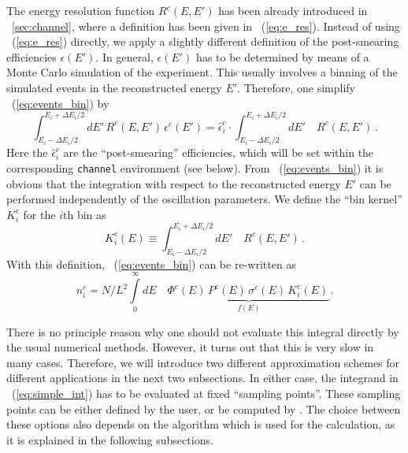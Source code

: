 The energy resolution function $R^c(E,E')$ has been already introduced in 
\Sec~\ref{sec:channel}, where a definition
has been given in \eq~(\ref{eq:e_res}). Instead of using
 \eq~(\ref{eq:e_res}) directly, we apply a slightly different
definition of the post-smearing efficiencies $\epsilon(E')$. 
In general, $\epsilon(E')$ has to be
determined by means of a Monte Carlo simulation of the experiment. 
This usually involves a binning of the simulated events in the 
reconstructed energy $E'$. Therefore, one simplify \eq~(\ref{eq:events_bin}) by
\begin{equation}
\label{eq:post_smearing}
\int_{E_i-\Delta E_i/2}^{E_i+\Delta E_i/2} dE' \, R^c(E,E') \, \epsilon^c(E') = \hat\epsilon_i^c \cdot \int_{E_i-\Delta E_i/2}^{E_i+\Delta E_i/2} dE' 
\quad R^c(E,E')\,.
\end{equation}
Here the  $\hat\epsilon_i^c$ are the 
``post-smearing'' efficiencies, which will be set within the corresponding {\tt channel} environment (see below).
From \eq~(\ref{eq:events_bin}) it is obvious that the integration with respect to the reconstructed energy $E'$ can be
performed independently of the oscillation parameters. We define
the ``bin kernel'' $K_i^c$ for the $i$th bin as
\begin{equation}
\label{eq:kernel}
K_i^c(E) \equiv \int_{E_i-\Delta E_i/2}^{E_i+\Delta E_i/2} dE' 
\quad R^c(E,E')\,.
\end{equation}
With this definition, \eq~(\ref{eq:events_bin}) can be re-written as
\begin{equation}
\label{eq:simple_int}
n_i^c=N/L^2 \int\limits_0^\infty dE\quad  \underbrace{\Phi^c(E)\,
P^c(E)\,
\sigma^c(E)\,
K_i^c(E)\,}_{f(E)}. 
\end{equation}

There is no principle reason why one should not evaluate this integral directly by the usual numerical methods. However, it turns out that this 
is very slow in many cases. Therefore, we will introduce two different approximation schemes for different applications in the next two subsections.
In either case, the integrand in \eq~(\ref{eq:simple_int}) has to be evaluated at fixed ``sampling points''. These sampling points can be 
either defined by the user, or be computed by
\GLOBES . The choice between these options also depends on 
the algorithm which is used for the calculation, as it is explained in the following subsections. 

